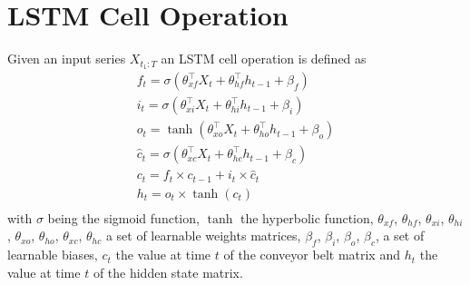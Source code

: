 \section{LSTM Cell Operation}
Given an input series $X_{t_1:T}$ an LSTM cell operation is defined as
\begin{gather}
    \label{lstm_operation}
    f_t = \sigma(\theta_{xf}^\top X_t + \theta_{hf}^\top h_{t-1} + \beta_f) \\ \nonumber
    i_t = \sigma(\theta_{xi}^\top X_t + \theta_{hi}^\top h_{t-1} + \beta_i) \\ \nonumber
    o_t = \tanh(\theta_{xo}^\top X_t + \theta_{ho}^\top h_{t-1} + \beta_o) \\ \nonumber
    \widehat{c}_t = \sigma(\theta_{xc}^\top X_t + \theta_{hc}^\top h_{t-1} + \beta_c) \\ \nonumber
    c_t = f_t \times c_{t-1} + i_t \times \widehat{c}_t \\ \nonumber
    h_t = o_t \times \tanh(c_t) \\ \nonumber
\end{gather}
with $\sigma$  being the sigmoid function, $\tanh$ the hyperbolic function, $\theta_{xf}$, $\theta_{hf}$, $\theta_{xi}$, $\theta_{hi}$, $\theta_{xo}$, $\theta_{ho}$, $\theta_{xc}$, $\theta_{hc}$ a set of learnable weights matrices, $\beta_f$, $\beta_i$, $\beta_o$, $\beta_c$, a set of learnable biases, $c_t$ the value at time $t$ of the conveyor belt matrix and $h_t$ the value at time $t$ of the hidden state matrix.

